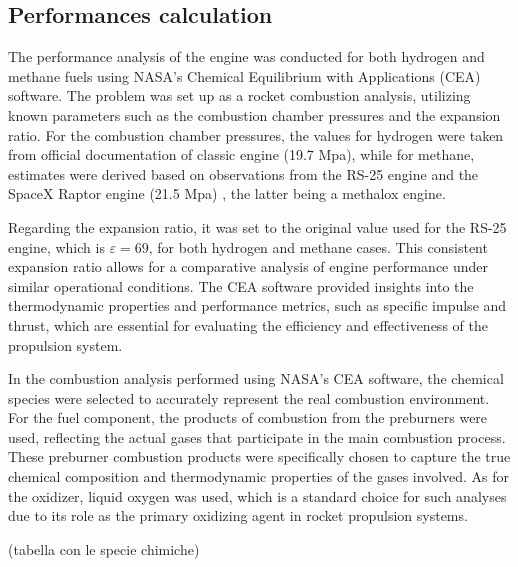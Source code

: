 \subsection{Performances calculation}
The performance analysis of the engine was conducted for both hydrogen and methane fuels using NASA's Chemical Equilibrium with Applications (CEA) software. 
The problem was set up as a rocket combustion analysis, utilizing known parameters such as the combustion chamber pressures and the expansion ratio. 
For the combustion chamber pressures, the values for hydrogen were taken from official documentation of classic engine (19.7 Mpa), while for methane, estimates were derived based on observations from the RS-25 engine and the SpaceX Raptor engine (21.5 Mpa) , the latter being a methalox engine.

Regarding the expansion ratio, it was set to the original value used for the RS-25 engine, which is \(\varepsilon = 69\), for both hydrogen and methane cases.
This consistent expansion ratio allows for a comparative analysis of engine performance under similar operational conditions. 
The CEA software provided insights into the thermodynamic properties and performance metrics, such as specific impulse and thrust, which are essential for evaluating the efficiency and effectiveness of the propulsion system.

In the combustion analysis performed using NASA's CEA software, the chemical species were selected to accurately represent the real combustion environment. For the fuel component, the products of combustion from the preburners were used, reflecting the actual gases that participate in the main combustion process. These preburner combustion products were specifically chosen to capture the true chemical composition and thermodynamic properties of the gases involved. As for the oxidizer, liquid oxygen was used, which is a standard choice for such analyses due to its role as the primary oxidizing agent in rocket propulsion systems.

(tabella con le specie chimiche)

